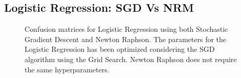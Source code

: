 \documentclass
[twocolumn,
secnumarabic,
nobibnotes,
aps,
prl,
reprint,
groupedaddress,
amsmath,
amssymb
]{revtex4-2}
\begin{document}
\subsection{Logistic Regression: SGD Vs NRM}
\begin{figure}
  \caption{Confusion matrices for Logistic Regression using both Stochastic Gradient Descent and Newton Raphson. The parameters for the Logistic Regression has been optimized considering the SGD algorithm using the Grid Search. Newton Raphson does not require the same hyperparameters.\label{fig:conf_matrix_sgd_nrm}}
\end{figure}
\end{document}

